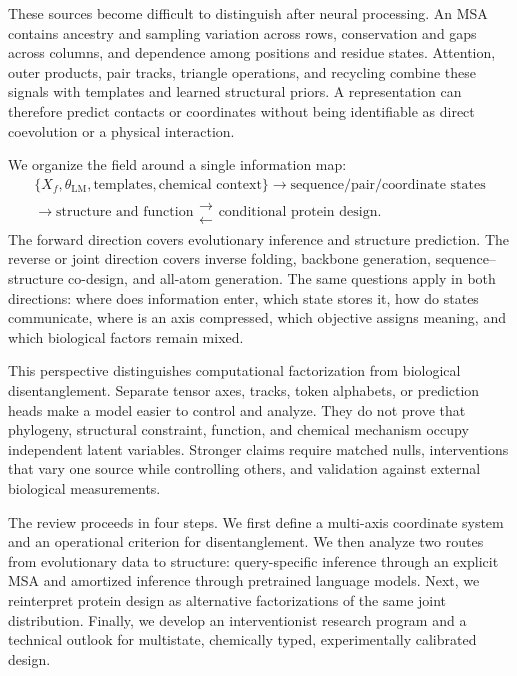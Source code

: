 \documentclass[10pt]{article}
\begin{document}
These sources become difficult to distinguish after neural processing.  An MSA contains ancestry
and sampling variation across rows, conservation and gaps across columns, and dependence among
positions and residue states.  Attention, outer products, pair tracks, triangle operations, and
recycling combine these signals with templates and learned structural priors.  A representation can
therefore predict contacts or coordinates without being identifiable as direct coevolution or a
physical interaction.

We organize the field around a single information map:
\begin{equation}
\boxed{
\begin{gathered}
\{X_f,\theta_{\mathrm{LM}},\text{templates},\text{chemical context}\}
\longrightarrow
\text{sequence/pair/coordinate states}\\
\longrightarrow
\text{structure and function}
\mathrel{\substack{\longrightarrow\\[-4pt]\longleftarrow}}
\text{conditional protein design}.
\end{gathered}}
\label{eq:unified-information-map}
\end{equation}
The forward direction covers evolutionary inference and structure prediction.  The reverse or joint
direction covers inverse folding, backbone generation, sequence--structure co-design, and all-atom
generation.  The same questions apply in both directions: where does information enter, which state
stores it, how do states communicate, where is an axis compressed, which objective assigns meaning,
and which biological factors remain mixed.

This perspective distinguishes computational factorization from biological disentanglement.
Separate tensor axes, tracks, token alphabets, or prediction heads make a model easier to control and
analyze.  They do not prove that phylogeny, structural constraint, function, and chemical mechanism
occupy independent latent variables.  Stronger claims require matched nulls, interventions that vary
one source while controlling others, and validation against external biological measurements.

The review proceeds in four steps.  We first define a multi-axis coordinate system and an operational
criterion for disentanglement.  We then analyze two routes from evolutionary data to structure:
query-specific inference through an explicit MSA and amortized inference through pretrained language
models.  Next, we reinterpret protein design as alternative factorizations of the same joint
distribution.  Finally, we develop an interventionist research program and a technical outlook for
multistate, chemically typed, experimentally calibrated design.
\end{document}
